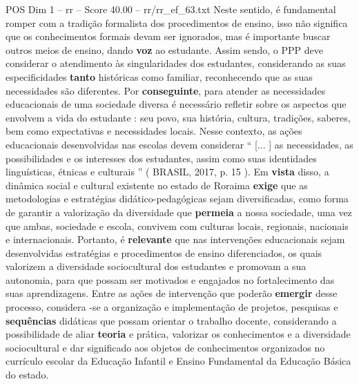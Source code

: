 \begin{textsample}{POS Dim 1 – rr – Score 40.00 – rr/rr\_ef\_63.txt}
Neste sentido, é fundamental romper com a tradição formalista dos procedimentos de ensino, isso não significa que os conhecimentos formais devam ser ignorados, mas é importante buscar outros meios de ensino, dando \textbf{voz} ao estudante.
Assim sendo, o PPP deve considerar o atendimento às singularidades dos estudantes, considerando as suas especificidades \textbf{tanto} históricas como familiar, reconhecendo que as suas necessidades são diferentes.
Por \textbf{conseguinte}, para atender as necessidades educacionais de uma sociedade diversa é necessário refletir sobre os aspectos que envolvem a vida do estudante : seu povo, sua história, cultura, tradições, saberes, bem como expectativas e necessidades locais.
Nesse contexto, as ações educacionais desenvolvidas nas escolas devem considerar “ [... ] as necessidades, as possibilidades e os interesses dos estudantes, assim como suas identidades linguísticas, étnicas e culturais ” ( BRASIL, 2017, p. 15 ).
Em \textbf{vista} disso, a dinâmica social e cultural existente no estado de Roraima \textbf{exige} que as metodologias e estratégias didático-pedagógicas sejam diversificadas, como forma de garantir a valorização da diversidade que \textbf{permeia} a nossa sociedade, uma vez que ambas, sociedade e escola, convivem com culturas locais, regionais, nacionais e internacionais.
Portanto, é \textbf{relevante} que nas intervenções educacionais sejam desenvolvidas estratégias e procedimentos de ensino diferenciados, os quais valorizem a diversidade sociocultural dos estudantes e promovam a sua autonomia, para que possam ser motivados e engajados no fortalecimento das suas aprendizagens.
Entre as ações de intervenção que poderão \textbf{emergir} desse processo, considera -se a organização e implementação de projetos, pesquisas e \textbf{sequências} didáticas que possam orientar o trabalho docente, considerando a possibilidade de aliar \textbf{teoria} e prática, valorizar os conhecimentos e a diversidade sociocultural e dar significado aos objetos de conhecimentos organizados no currículo escolar da Educação Infantil e Ensino Fundamental da Educação Básica do estado.

\end{textsample}
